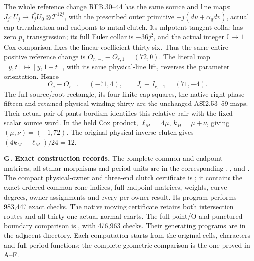 The whole reference change RFB.30--44 has the same source and line maps:
\(J_j:U_j\to I_j^*U_0\otimes\mathcal T^{12j}\), with the prescribed
outer primitive \(-j(du+\alpha_qdv)\), actual cap trivialization and
endpoint-to-initial clutch.  Its nilpotent tangent collar has zero
\(p_1\) transgression; its full Euler collar is \(-36j^2\), and the
actual integer \(0\to1\) Cox comparison fixes the linear coefficient
thirty-six.  Thus the same entire positive reference change is
\(O_{r,-1}-O_{r,1}=(72,0)\).  The literal map
\([y,t]\mapsto[y,1-t]\), with its same physical-line lift, reverses
the parameter orientation.  Hence
\[
 O_c-O_{r,-1}=(-71,4),\qquad J_c-J_{r,-1}=(71,-4).
\]
The full source/root rectangle, its four finite-cap squares, the native
right phase fifteen and retained physical winding thirty are the
unchanged ASI2.53--59 maps.  Their actual pair-of-pants bordism identifies
this relative pair with the fixed-scalar source word.  In the held Cox
product, \(\ell_M=4\mu\), \(k_M=\mu+\nu\), giving
\((\mu,\nu)=(-1,72)\).  The original physical inverse clutch gives
\((4k_M-\ell_M)/24=12\).

\medskip\noindent\textbf{G. Exact construction records.}
The complete common and endpoint matrices, all stellar morphisms and
period units are in the corresponding
,
,
 and
.
The compact physical-owner and three-end clutch certificate is
; it
contains the exact ordered common-cone indices, full endpoint matrices,
weights, curve degrees, owner assignments and every per-owner result.
Its program performs 983,447 exact checks.  The native moving certificate
 retains both
intersection routes and all thirty-one actual normal charts.  The full
point/O and punctured-boundary comparison is
,
with 476,963 checks.  Their generating programs are in the adjacent
 directory.  Each computation starts from the original cells,
characters and full period functions; the complete geometric comparison
is the one proved in A--F.
